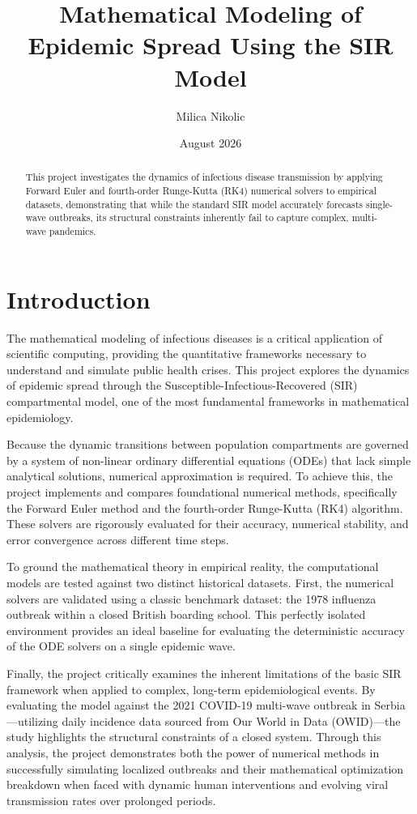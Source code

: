 \documentclass[12pt,a4paper]{article}
\title{\textbf{Mathematical Modeling of Epidemic Spread Using the SIR Model}}
\author{Milica Nikolic}
\date{August 2026}
\begin{document}
\maketitle

\begin{abstract}
This project investigates the dynamics of infectious disease transmission by applying Forward Euler and fourth-order Runge-Kutta (RK4) numerical solvers to empirical datasets, demonstrating that while the standard SIR model accurately forecasts single-wave outbreaks, its structural constraints inherently fail to capture complex, multi-wave pandemics.
\end{abstract}
\section{Introduction}
The mathematical modeling of infectious diseases is a critical application of scientific computing, providing the quantitative frameworks necessary to understand and simulate public health crises. This project explores the dynamics of epidemic spread through the Susceptible-Infectious-Recovered (SIR) compartmental model, one of the most fundamental frameworks in mathematical epidemiology. 

Because the dynamic transitions between population compartments are governed by a system of non-linear ordinary differential equations (ODEs) that lack simple analytical solutions, numerical approximation is required. To achieve this, the project implements and compares foundational numerical methods, specifically the Forward Euler method and the fourth-order Runge-Kutta (RK4) algorithm. These solvers are rigorously evaluated for their accuracy, numerical stability, and error convergence across different time steps.

To ground the mathematical theory in empirical reality, the computational models are tested against two distinct historical datasets. First, the numerical solvers are validated using a classic benchmark dataset: the 1978 influenza outbreak within a closed British boarding school. This perfectly isolated environment provides an ideal baseline for evaluating the deterministic accuracy of the ODE solvers on a single epidemic wave.

Finally, the project critically examines the inherent limitations of the basic SIR framework when applied to complex, long-term epidemiological events. By evaluating the model against the 2021 COVID-19 multi-wave outbreak in Serbia—utilizing daily incidence data sourced from Our World in Data (OWID)—the study highlights the structural constraints of a closed system. Through this analysis, the project demonstrates both the power of numerical methods in successfully simulating localized outbreaks and their mathematical optimization breakdown when faced with dynamic human interventions and evolving viral transmission rates over prolonged periods.
\end{document}

